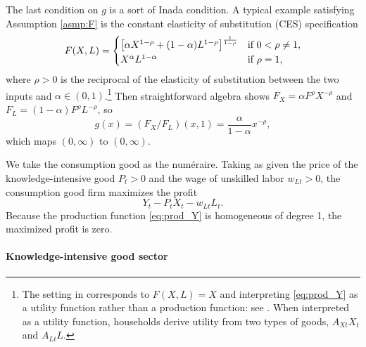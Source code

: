 \documentclass[a4paper,12pt]{article}
\numberwithin{equation}{section}
\theoremstyle{plain}
\begin{document}
The last condition on $g$ is a sort of Inada condition. A typical example satisfying Assumption \ref{asmp:F} is the constant elasticity of substitution (CES) specification
\begin{equation}
    F(X,L)=\begin{cases*}
        \left[ \alpha X^{1-\rho} + (1-\alpha) L^{1-\rho} \right]^{\frac{1}{1-\rho}} & if $0<\rho\neq 1$,\\
        X^\alpha L^{1-\alpha} & if $\rho=1$,
    \end{cases*} \label{eq:F_CES}
\end{equation}
where $\rho>0$ is the reciprocal of the elasticity of substitution between the two inputs and $\alpha\in (0,1)$.\footnote{The setting in \citet[Ch.~3]{GrossmanHelpman1991book} corresponds to $F(X,L)=X$ and interpreting \eqref{eq:prod_Y} as a utility function rather than a production function: see \citet[Footnote 2]{Benassy1998}. When interpreted as a utility function, households derive utility from two types of goods, $A_{Xt}X_t$ and $A_{Lt}L$.} Then straightforward algebra shows $F_X=\alpha F^\rho X^{-\rho}$ and $F_L=(1-\alpha) F^\rho L^{-\rho}$, so
\begin{equation}
    g(x)=(F_X/F_L)(x,1)=\frac{\alpha}{1-\alpha}x^{-\rho}, \label{eq:g_CES}
\end{equation}
which maps $(0,\infty)$ to $(0,\infty)$.

We take the consumption good as the num\'eraire. Taking as given the price of the knowledge-intensive good $P_t>0$ and the wage of unskilled labor $w_{Lt}>0$, the consumption good firm maximizes the profit
\begin{equation}
    Y_t-P_tX_t-w_{Lt}L_t. \label{eq:profit_Y}
\end{equation}
Because the production function \eqref{eq:prod_Y} is homogeneous of degree 1, the maximized profit is zero.

\paragraph{Knowledge-intensive good sector}
\end{document}
